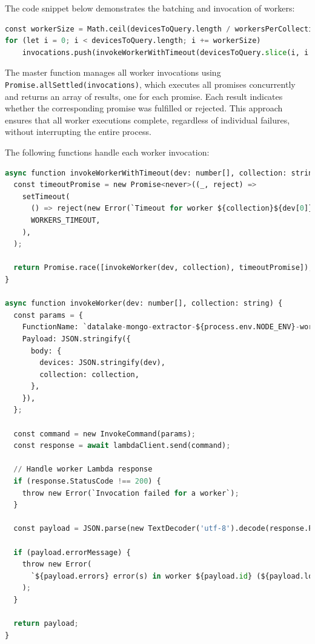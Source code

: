 The code snippet below demonstrates the batching and invocation of workers:
    \begin{lstlisting}[language=Python, caption=Device batching]
const workerSize = Math.ceil(devicesToQuery.length / workersPerCollection[operationalMode][collection])
for (let i = 0; i < devicesToQuery.length; i += workerSize)
    invocations.push(invokeWorkerWithTimeout(devicesToQuery.slice(i, i + workerSize), collection))
\end{lstlisting}

The master function manages all worker invocations using \texttt{Promise.allSettled(invocations)}, which executes all promises concurrently and returns an array of results, one for each promise. Each result indicates whether the corresponding promise was fulfilled or rejected. This approach ensures that all worker executions complete, regardless of individual failures, without interrupting the entire process.

The following functions handle each worker invocation:

\begin{lstlisting}[language=Python, caption=\texttt{invokeWorkerWithTimeout} and \texttt{invokeWorker} functions]
async function invokeWorkerWithTimeout(dev: number[], collection: string) {
  const timeoutPromise = new Promise<never>((_, reject) =>
    setTimeout(
      () => reject(new Error(`Timeout for worker ${collection}${dev[0]}`)),
      WORKERS_TIMEOUT,
    ),
  );

  return Promise.race([invokeWorker(dev, collection), timeoutPromise]);
}

async function invokeWorker(dev: number[], collection: string) {
  const params = {
    FunctionName: `datalake-mongo-extractor-${process.env.NODE_ENV}-worker`,
    Payload: JSON.stringify({
      body: {
        devices: JSON.stringify(dev),
        collection: collection,
      },
    }),
  };

  const command = new InvokeCommand(params);
  const response = await lambdaClient.send(command);

  // Handle worker Lambda response
  if (response.StatusCode !== 200) {
    throw new Error(`Invocation failed for a worker`);
  }

  const payload = JSON.parse(new TextDecoder('utf-8').decode(response.Payload));

  if (payload.errorMessage) {
    throw new Error(
      `${payload.errors} error(s) in worker ${payload.id} (${payload.log_stream_name})`,
    );
  }

  return payload;
}
\end{lstlisting}

